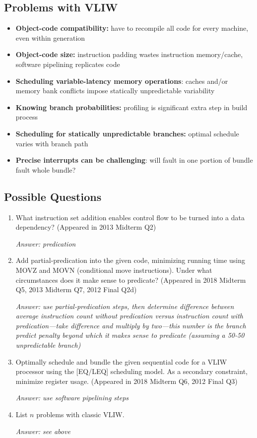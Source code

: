 \documentclass{article}
\begin{document}
\subsection{Problems with VLIW}

\begin{itemize}
\item \textbf{Object-code compatibility:} have to recompile all code for every machine, even within generation
\item \textbf{Object-code size:} instruction padding wastes instruction memory/cache, software pipelining replicates code
\item \textbf{Scheduling variable-latency memory operations}: caches and/or memory bank conflicts impose statically unpredictable variability
\item \textbf{Knowing branch probabilities:} profiling is significant extra step in build process
\item \textbf{Scheduling for statically unpredictable branches:} optimal schedule varies with branch path
\item \textbf{Precise interrupts can be challenging}: will fault in one portion of bundle fault whole bundle?
\end{itemize}

\subsection{Possible Questions}

\begin{enumerate}
\item What instruction set addition enables control flow to be turned into a data dependency? (Appeared in 2013 Midterm Q2)

\textit{Answer: predication}

\item Add partial-predication into the given code, minimizing running time using MOVZ and MOVN (conditional move instructions). Under what circumstances does it make sense to predicate? (Appeared in 2018 Midterm Q5, 2013 Midterm Q7, 2012 Final Q2d)

\textit{Answer: use partial-predication steps, then determine difference between average instruction count without predication versus instruction count with predication---take difference and multiply by two---this number is the branch predict penalty beyond which it makes sense to predicate (assuming a 50-50 unpredictable branch)}

\item Optimally schedule and bundle the given sequential code for a VLIW processor using the [EQ/LEQ] scheduling model. As a secondary constraint, minimize register usage. (Appeared in 2018 Midterm Q6, 2012 Final Q3)

\textit{Answer: use software pipelining steps}

\item List $n$ problems with classic VLIW.

\textit{Answer: see above}
\end{enumerate}
\end{document}

